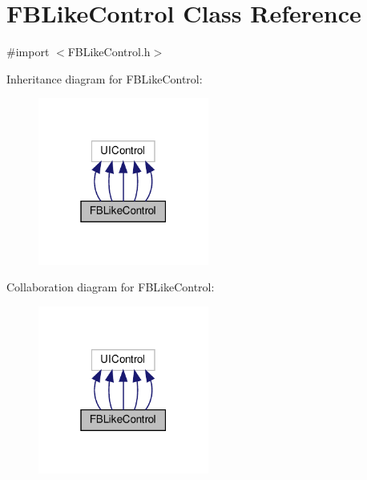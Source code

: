 \hypertarget{interfaceFBLikeControl}{}\section{F\+B\+Like\+Control Class Reference}
\label{interfaceFBLikeControl}


{\ttfamily \#import $<$F\+B\+Like\+Control.\+h$>$}



Inheritance diagram for F\+B\+Like\+Control\+:
\nopagebreak
\begin{figure}[H]
\begin{center}
\leavevmode
\includegraphics[width=159pt]{interfaceFBLikeControl__inherit__graph}
\end{center}
\end{figure}


Collaboration diagram for F\+B\+Like\+Control\+:
\nopagebreak
\begin{figure}[H]
\begin{center}
\leavevmode
\includegraphics[width=159pt]{interfaceFBLikeControl__coll__graph}
\end{center}
\end{figure}
